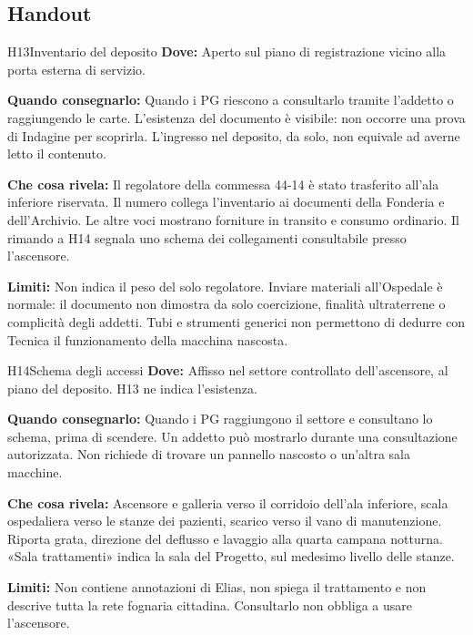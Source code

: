 \documentclass[11pt,a4paper]{article}
\begin{document}
\subsection{Handout}
\label{nodo-7-handout}
{}
\begin{handoutbox}{H13}{Inventario del deposito}
\textbf{Dove:} Aperto sul piano di registrazione vicino alla porta esterna di servizio.

\textbf{Quando consegnarlo:} Quando i PG riescono a consultarlo tramite l'addetto o raggiungendo le carte. L'esistenza del documento è visibile: non occorre una prova di Indagine per scoprirla. L'ingresso nel deposito, da solo, non equivale ad averne letto il contenuto.

\textbf{Che cosa rivela:} Il regolatore della commessa 44-14 è stato trasferito all'ala inferiore riservata. Il numero collega l'inventario ai documenti della Fonderia e dell'Archivio. Le altre voci mostrano forniture in transito e consumo ordinario. Il rimando a H14 segnala uno schema dei collegamenti consultabile presso l'ascensore.

\textbf{Limiti:} Non indica il peso del solo regolatore. Inviare materiali all'Ospedale è normale: il documento non dimostra da solo coercizione, finalità ultraterrene o complicità degli addetti. Tubi e strumenti generici non permettono di dedurre con Tecnica il funzionamento della macchina nascosta.
\end{handoutbox}

{}
\begin{handoutbox}{H14}{Schema degli accessi}
\textbf{Dove:} Affisso nel settore controllato dell'ascensore, al piano del deposito. H13 ne indica l'esistenza.

\textbf{Quando consegnarlo:} Quando i PG raggiungono il settore e consultano lo schema, prima di scendere. Un addetto può mostrarlo durante una consultazione autorizzata. Non richiede di trovare un pannello nascosto o un'altra sala macchine.

\textbf{Che cosa rivela:} Ascensore e galleria verso il corridoio dell'ala inferiore, scala ospedaliera verso le stanze dei pazienti, scarico verso il vano di manutenzione. Riporta grata, direzione del deflusso e lavaggio alla quarta campana notturna. «Sala trattamenti» indica la sala del Progetto, sul medesimo livello delle stanze.

\textbf{Limiti:} Non contiene annotazioni di Elias, non spiega il trattamento e non descrive tutta la rete fognaria cittadina. Consultarlo non obbliga a usare l'ascensore.
\end{handoutbox}
\end{document}
